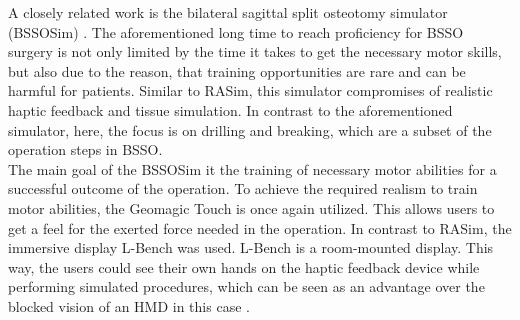 A closely related work is the bilateral sagittal split osteotomy 
simulator (BSSOSim) \cite{RN69}.
The aforementioned long time to reach proficiency for BSSO surgery
is not only limited by the time it takes to get the necessary motor
skills, but also due to the reason, that 
training opportunities are rare and can be harmful for
patients. Similar to RASim, this simulator compromises of 
realistic haptic feedback and tissue simulation.
In contrast to the aforementioned simulator, 
here, the focus is on drilling and breaking, which are a subset of 
the operation steps in BSSO.
\\ The main goal of the BSSOSim it the training of necessary motor 
abilities for a successful
outcome of the operation. To achieve the required realism to train motor 
abilities, the Geomagic Touch is once again utilized.
This allows users to
get a feel for the exerted force needed in the operation. 
In contrast to RASim, the immersive display L-Bench was used.
L-Bench is a room-mounted display. 
This way, the users could see their own hands on the haptic
feedback device while performing simulated procedures,
which can be seen as an advantage over the blocked vision
of an HMD in this case \cite{RN69}.

